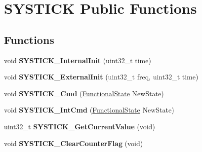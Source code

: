 \hypertarget{group___s_y_s_t_i_c_k___public___functions}{\section{\-S\-Y\-S\-T\-I\-C\-K \-Public \-Functions}
\label{group___s_y_s_t_i_c_k___public___functions}
}
\subsection*{\-Functions}
\begin{DoxyCompactItemize}
\item 
\hypertarget{group___s_y_s_t_i_c_k___public___functions_gaaa58389562c2517c87b35c25ff3fe72f}{void {\bfseries \-S\-Y\-S\-T\-I\-C\-K\-\_\-\-Internal\-Init} (uint32\-\_\-t time)}\label{group___s_y_s_t_i_c_k___public___functions_gaaa58389562c2517c87b35c25ff3fe72f}

\item 
\hypertarget{group___s_y_s_t_i_c_k___public___functions_ga3b0aa8d996b15c7a65c73e1d260c4610}{void {\bfseries \-S\-Y\-S\-T\-I\-C\-K\-\_\-\-External\-Init} (uint32\-\_\-t freq, uint32\-\_\-t time)}\label{group___s_y_s_t_i_c_k___public___functions_ga3b0aa8d996b15c7a65c73e1d260c4610}

\item 
\hypertarget{group___s_y_s_t_i_c_k___public___functions_ga3b596477272826bd63609aae8b17e3cd}{void {\bfseries \-S\-Y\-S\-T\-I\-C\-K\-\_\-\-Cmd} (\hyperlink{group___l_p_c___types___public___types_gac9a7e9a35d2513ec15c3b537aaa4fba1}{\-Functional\-State} \-New\-State)}\label{group___s_y_s_t_i_c_k___public___functions_ga3b596477272826bd63609aae8b17e3cd}

\item 
\hypertarget{group___s_y_s_t_i_c_k___public___functions_gac9fb359a9f54b10900f82c0f28cc57a1}{void {\bfseries \-S\-Y\-S\-T\-I\-C\-K\-\_\-\-Int\-Cmd} (\hyperlink{group___l_p_c___types___public___types_gac9a7e9a35d2513ec15c3b537aaa4fba1}{\-Functional\-State} \-New\-State)}\label{group___s_y_s_t_i_c_k___public___functions_gac9fb359a9f54b10900f82c0f28cc57a1}

\item 
\hypertarget{group___s_y_s_t_i_c_k___public___functions_gaef97fe4b9518138c9cf1abc579dacfaa}{uint32\-\_\-t {\bfseries \-S\-Y\-S\-T\-I\-C\-K\-\_\-\-Get\-Current\-Value} (void)}\label{group___s_y_s_t_i_c_k___public___functions_gaef97fe4b9518138c9cf1abc579dacfaa}

\item 
\hypertarget{group___s_y_s_t_i_c_k___public___functions_gabf35fbc4ec04dd99751422248e0cbd7a}{void {\bfseries \-S\-Y\-S\-T\-I\-C\-K\-\_\-\-Clear\-Counter\-Flag} (void)}\label{group___s_y_s_t_i_c_k___public___functions_gabf35fbc4ec04dd99751422248e0cbd7a}

\end{DoxyCompactItemize}
